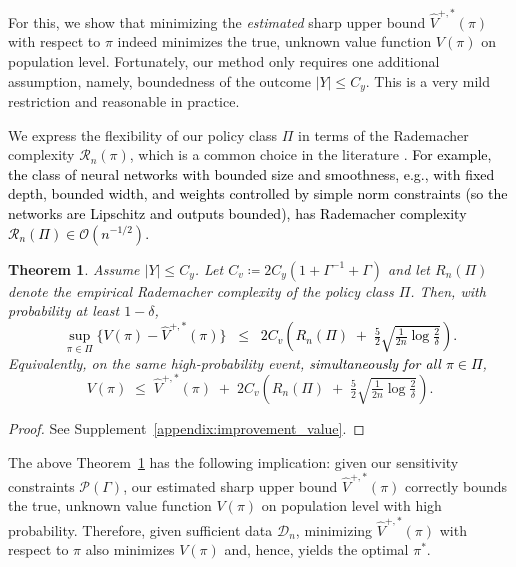 \documentclass{article} %
\theoremstyle{plain}
\newtheorem{theorem}{Theorem}[section]
\theoremstyle{definition}
\theoremstyle{remark}
\newcommand{\rebuttal}[1]{\textcolor{black}{#1}}
\begin{document}
For this, we show that minimizing the \emph{estimated} sharp upper bound $\hat{V}^{+,*}(\pi)$ with respect to $\pi$ indeed minimizes the true, unknown value function $V(\pi)$ on population level. Fortunately, our method only requires one additional assumption, namely, {boundedness of the outcome} $|Y|\leq C_y$. This is a very mild restriction and reasonable in practice.

We express the flexibility of our policy class $\Pi$ in terms of the Rademacher complexity $\mathcal{R}_n(\pi)$, which is a common choice in the literature \citep{Athey.2021, Frauen.2024,Hatt.2022b, Kallus.2018c}. \rebuttal{For example, the class of neural networks with bounded size and smoothness, e.g., with fixed depth, bounded width, and weights controlled by simple norm constraints (so the networks are Lipschitz and outputs bounded), has Rademacher complexity $\mathcal{R}_n(\Pi)\in\mathcal{O}(n^{-1/2})$.}

\begin{theorem}\label{prop:improvement_value}
Assume $|Y|\le C_y$. Let $C_v \coloneqq 2C_y(1+\Gamma^{-1}+\Gamma)$ and let $R_n(\Pi)$ denote the empirical Rademacher complexity of the policy class $\Pi$. Then, with probability at least $1-\delta$,
\rebuttal{
\begin{equation}\label{eq:uniform_bound}
\sup_{\pi\in\Pi}\Big\{ V(\pi) - \hat V^{+,*}(\pi) \Big\}
\;\;\le\;\; 2C_v\!\left( R_n(\Pi) \;+\; \tfrac{5}{2}\sqrt{\tfrac{1}{2n}\log\!\tfrac{2}{\delta}} \right).
\end{equation}
}
Equivalently, on the same high-probability event, \rebuttal{\emph{simultaneously for all} $\pi\in\Pi$},
\begin{equation}\label{eq:uniform_per_policy}
V(\pi)\;\le\; \hat V^{+,*}(\pi) \;+\; 2C_v\!\left( R_n(\Pi) \;+\; \tfrac{5}{2}\sqrt{\tfrac{1}{2n}\log\!\tfrac{2}{\delta}} \right).
\end{equation}

\end{theorem}
\begin{proof}
    See Supplement~\ref{appendix:improvement_value}.
\end{proof}

The above Theorem~\ref{prop:improvement_value} has the following implication: given our sensitivity constraints $\mathcal{P}(\Gamma)$, our estimated sharp upper bound $\hat{V}^{+,*}(\pi)$ correctly bounds the true, unknown value function $V(\pi)$ on population level with high probability. Therefore, given sufficient data $\mathcal{D}_n$, minimizing $\hat{V}^{+,*}(\pi)$ with respect to $\pi$ also minimizes $V(\pi)$ and, hence, yields the optimal $\pi^*$.
\end{document}
